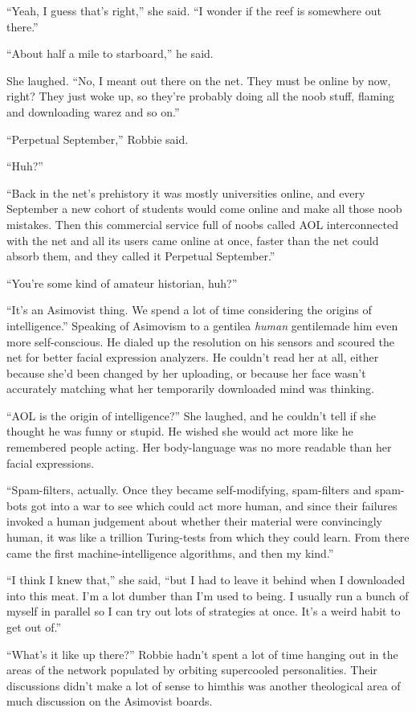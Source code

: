 “Yeah, I guess that’s right,” she said. “I wonder if the reef is
somewhere out there.”

“About half a mile to starboard,” he said.

She laughed. “No, I meant out there on the net. They must be online
by now, right? They just woke up, so they’re probably doing all the
noob stuff, flaming and downloading warez and so on.”

“Perpetual September,” Robbie said.

“Huh?”

“Back in the net’s prehistory it was mostly universities online,
and every September a new cohort of students would come online and
make all those noob mistakes. Then this commercial service full of
noobs called AOL interconnected with the net and all its users came
online at once, faster than the net could absorb them, and they
called it Perpetual September.”

“You’re some kind of amateur historian, huh?”

“It’s an Asimovist thing. We spend a lot of time considering the
origins of intelligence.” Speaking of Asimovism to a gentile\dash{}a
\emph{human} gentile\dash{}made him even more self-conscious. He dialed
up the resolution on his sensors and scoured the net for better
facial expression analyzers. He couldn’t read her at all, either
because she’d been changed by her uploading, or because her face
wasn’t accurately matching what her temporarily downloaded mind was
thinking.

“AOL is the origin of intelligence?” She laughed, and he couldn’t
tell if she thought he was funny or stupid. He wished she would act
more like he remembered people acting. Her body-language was no
more readable than her facial expressions.

“Spam-filters, actually. Once they became self-modifying,
spam-filters and spam-bots got into a war to see which could act
more human, and since their failures invoked a human judgement
about whether their material were convincingly human, it was like a
trillion Turing-tests from which they could learn. From there came
the first machine-intelligence algorithms, and then my kind.”

“I think I knew that,” she said, “but I had to leave it behind when
I downloaded into this meat. I’m a lot dumber than I’m used to
being. I usually run a bunch of myself in parallel so I can try out
lots of strategies at once. It’s a weird habit to get out of.”

“What’s it like up there?” Robbie hadn’t spent a lot of time
hanging out in the areas of the network populated by orbiting
supercooled personalities. Their discussions didn’t make a lot of
sense to him\dash{}this was another theological area of much discussion
on the Asimovist boards.

